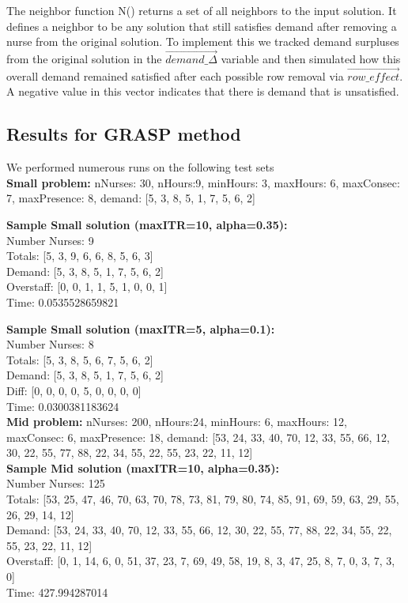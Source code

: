 \documentclass[11pt]{article}
\begin{document}
The neighbor function N() returns a set of all neighbors to the input solution. 
It defines a neighbor to be any solution that still satisfies demand after removing a nurse from the original solution.
To implement this we tracked demand surpluses from the original solution in the $\vec{demand\_\Delta}$ variable and then
simulated how this overall demand remained satisfied after each possible row removal via $\vec{row\_effect}$. A
negative value in this vector indicates that there is demand that is unsatisfied.

\subsection{Results for GRASP method}
We performed numerous runs on the following test sets\\

\noindent\textbf{Small problem:}
nNurses: 30,
nHours:9,
minHours: 3,
maxHours: 6,
maxConsec: 7,
maxPresence: 8,
demand: [5, 3, 8, 5, 1, 7, 5, 6, 2]\\

\pagebreak

\noindent\footnotesize{\textbf{Sample Small solution (maxITR=10, alpha=0.35):}\\
Number Nurses: 9\\
Totals: [5, 3, 9, 6, 6, 8, 5, 6, 3]\\
Demand: [5, 3, 8, 5, 1, 7, 5, 6, 2]\\
Overstaff: [0, 0, 1, 1, 5, 1, 0, 0, 1]\\
Time: 0.0535528659821\\}

\noindent\footnotesize{\textbf{Sample Small solution (maxITR=5, alpha=0.1):}\\
Number Nurses: 8\\
Totals: [5, 3, 8, 5, 6, 7, 5, 6, 2]\\
Demand: [5, 3, 8, 5, 1, 7, 5, 6, 2]\\
Diff: [0, 0, 0, 0, 5, 0, 0, 0, 0]\\
Time: 0.0300381183624}\\

\noindent\normalsize{\textbf{Mid problem:}
nNurses: 200,
nHours:24,
minHours: 6,
maxHours: 12,
maxConsec: 6,
maxPresence: 18,
demand: [53, 24, 33, 40, 70, 12, 33, 55, 66, 12, 30, 22, 55, 77, 88, 22, 34, 55, 22, 55, 23, 22, 11, 12]
}\\

\noindent\footnotesize{\textbf{Sample Mid solution (maxITR=10, alpha=0.35):}\\
Number Nurses: 125\\
Totals: [53, 25, 47, 46, 70, 63, 70, 78, 73, 81, 79, 80, 74, 85, 91, 69, 59, 63, 29, 55, 26, 29, 14, 12]\\
Demand: [53, 24, 33, 40, 70, 12, 33, 55, 66, 12, 30, 22, 55, 77, 88, 22, 34, 55, 22, 55, 23, 22, 11, 12]\\
Overstaff: [0, 1, 14, 6, 0, 51, 37, 23, 7, 69, 49, 58, 19, 8, 3, 47, 25, 8, 7, 0, 3, 7, 3, 0]\\
Time: 427.994287014}\\
\end{document}
